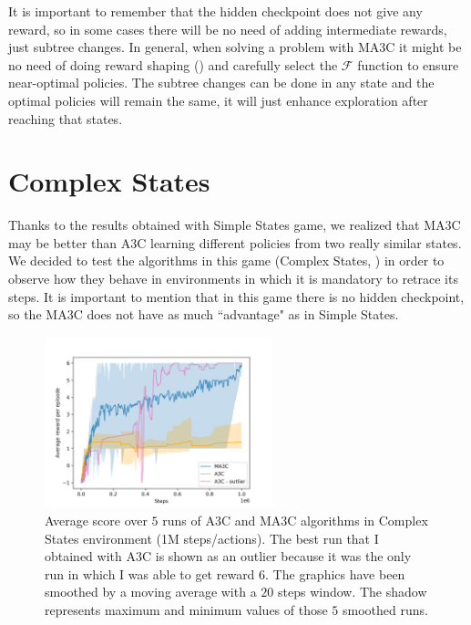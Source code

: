 It is important to remember that the hidden checkpoint does not give any reward, so in some cases there will be no need
of adding intermediate rewards, just subtree changes.
In general, when solving a problem with \ac{MA3C} it might be no need of doing reward shaping ()
and carefully select the $\mathcal{F}$ function to ensure near-optimal policies.
The subtree changes can be done in any state and the optimal policies will remain the same, it will just enhance exploration
after reaching that states.

\section{Complex States}

Thanks to the results obtained with Simple States game, we realized that \ac{MA3C} may be better than \ac{A3C} learning
different policies from two really similar states.
We decided to test the algorithms in this game (Complex States, ) in order to observe how they
behave in environments in which it is mandatory to retrace its steps.
It is important to mention that in this game there is no hidden checkpoint, so the \ac{MA3C} does not have as much
``advantage" as in Simple States.


\begin{figure}[hbtp]
\begin{center}
\includegraphics[width=250]{img/ComplexStates_performance.png}
\end{center}
\caption[Complex States performance]
{Average score over $5$ runs of \ac{A3C} and \ac{MA3C} algorithms in Complex States environment (1M steps/actions).
The best run that I obtained with \ac{A3C} is shown as an outlier because it was the only run in which I was able to get
reward $6$.
The graphics have been smoothed by a moving average with a $20$ steps window.
The shadow represents maximum and minimum values of those $5$ smoothed runs.}
\label{fig:ComplexStates_performance}
\end{figure}

